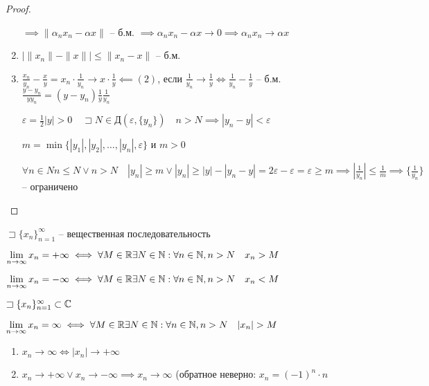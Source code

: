 \begin{proof}
\begin{enumerate}
            $\implies  \|\alpha_nx_n - \alpha x\|$ -- б.м. $\implies  \alpha_nx_n - \alpha x \to  0 \implies  \alpha_nx_n \to  \alpha x$
        \item $\left| \|x_{n} \| - \|x\| \right| \leqslant \|x_{n} -x\|$ -- б.м.

        \item $\frac{x_{n} }{y_{n} } - \frac{x}{y} = x_n\cdot \frac{1}{y_n} \to  x\cdot \frac{1}{y} \impliedby (2)$, если $\frac{1}{y_{n} } \to  \frac{1}{y} \iff  \frac{1}{y_{n} } - \frac{1}{y}$ -- б.м. $\frac{y-y_{n} }{yy_{n} } = (y-y_{n} )\frac{1}{y}\frac{1}{y_{n} }$

            $\varepsilon = \frac{1}{2}|y| >0\quad \sqsupset N \in \text{Д}\left( \varepsilon, \{y_{n} \} \right) \quad n>N \implies  |y_n-y| <\varepsilon$

            $m = \min\{|y_1|, |y_2|, \ldots, |y_n|, \varepsilon\}$ и $m>0$

            $\forall n\in N n\leqslant N \lor n>N\quad |y_n| \geqslant m \lor |y_n| \geqslant |y| - |y_n-y| = 2\varepsilon - \varepsilon = \varepsilon \geqslant m \implies  \left| \frac{1}{y_n} \right| \leqslant \frac{1}{m} \implies \{\frac{1}{y_{n} }\}$ -- ограничено

           
        \end{enumerate}
    \end{proof}
    \begin{definition}
        $\sqsupset \{x_{n}\}_{n=1}^{\infty } $ -- вещественная последовательность

        $\lim_{n \to \infty} x_n = +\infty  \iff  \forall M\in \R \exists N\in \N : \forall n\in \N , n>N\quad x_n>M$

        $\lim_{n \to \infty} x_n = -\infty  \iff  \forall M\in \R \exists  N\in \N : \forall n\in \N , n>N\quad x_n<M$

        $\sqsupset \{x_n\}_{n=1}^{\infty } \subset \mathbb{C}$

        $\lim_{n \to \infty} x_n = \infty \iff \forall M\in \R\exists N\in \N : \forall n\in \N , n>N\quad |x_n| >M$
    \end{definition}    
    \begin{note}
        \begin{enumerate}
            \item $x_n \to \infty  \iff  |x_n| \to +\infty $
            \item $x_n\to  +\infty  \lor x_n\to -\infty  \implies  x_n \to  \infty $ (обратное неверно: $x_n = (-1)^n\cdot n$
        \end{enumerate}
    \end{note}

